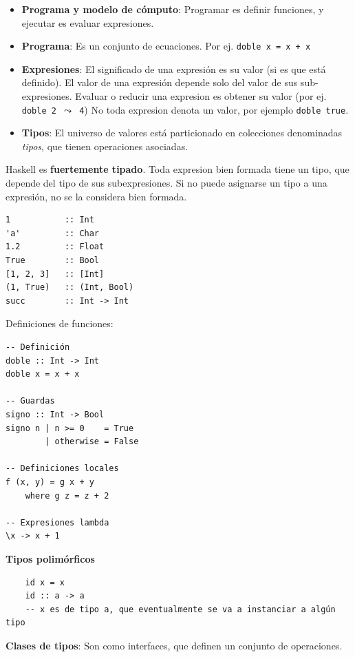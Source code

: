 \documentclass{report}
\theoremstyle{definition} %
\begin{document}
\begin{itemize}
    \item \textbf{Programa y modelo de cómputo}: Programar es definir
    funciones, y ejecutar es evaluar expresiones.
    \item \textbf{Programa}: Es un conjunto de ecuaciones. Por ej.
    \texttt{doble x = x + x}
    \item \textbf{Expresiones}: El significado de una expresión es su valor
    (si es que está definido). El valor de una expresión depende solo del
    valor de sus sub-expresiones. Evaluar o reducir una expresion es obtener
    su valor (por ej. \texttt{doble 2 $\leadsto$ 4})
    No toda expresion denota un valor, por ejemplo \texttt{doble true}.
    \item \textbf{Tipos}: El universo de valores está particionado en
    colecciones denominadas \textit{tipos}, que tienen operaciones asociadas.
\end{itemize}

Haskell es \textbf{fuertemente tipado}. Toda expresion bien formada tiene un
tipo, que depende del tipo de sus subexpresiones. Si no puede asignarse un tipo
a una expresión, no se la considera bien formada.

\begin{verbatim}
1           :: Int
'a'         :: Char
1.2         :: Float
True        :: Bool
[1, 2, 3]   :: [Int]
(1, True)   :: (Int, Bool)
succ        :: Int -> Int
\end{verbatim}

Definiciones de funciones:

\begin{verbatim}
-- Definición
doble :: Int -> Int
doble x = x + x

-- Guardas
signo :: Int -> Bool
signo n | n >= 0    = True
        | otherwise = False

-- Definiciones locales
f (x, y) = g x + y
    where g z = z + 2

-- Expresiones lambda
\x -> x + 1
\end{verbatim}

\textbf{Tipos polimórficos}

\begin{verbatim}
    id x = x
    id :: a -> a
    -- x es de tipo a, que eventualmente se va a instanciar a algún tipo
\end{verbatim}

\textbf{Clases de tipos}: Son como interfaces, que definen un conjunto de
operaciones.
\end{document}
